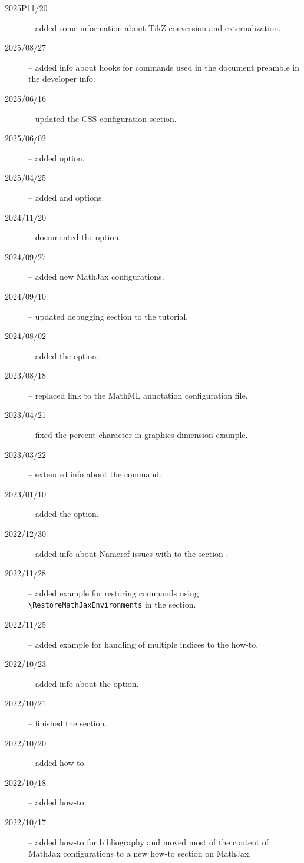 
\begin{description}
  \item[2025P11/20] -- added some information about TikZ conversion and externalization.
  \item[2025/08/27] -- added info about hooks for commands used in the document preamble in the developer info.
  \item[2025/06/16] -- updated the CSS configuration section.
  \item[2025/06/02] -- added  option.
  \item[2025/04/25] -- added  and  options.
  \item[2024/11/20] -- documented the  option.
  \item[2024/09/27] -- added new MathJax configurations. 
  \item[2024/09/10] -- updated debugging section to the tutorial.
  \item[2024/08/02] -- added the  option.
  \item[2023/08/18] -- replaced link to the MathML annotation configuration file.
  \item[2023/04/21] -- fixed the percent character in graphics dimension example.
  \item[2023/03/22] -- extended info about the  command.
  \item[2023/01/10] -- added the  option.
  \item[2022/12/30] -- added info about Nameref issues with  to the section .
  \item[2022/11/28] -- added example for restoring commands using \verb|\RestoreMathJaxEnvironments| in the  section.
  \item[2022/11/25] -- added example for handling of multiple indices to the  how-to.
  \item[2022/10/23] -- added info about the  option.
  \item[2022/10/21] -- finished the  section.
  \item[2022/10/20] -- added  how-to.
  \item[2022/10/18] -- added  how-to.
  \item[2022/10/17] -- added how-to for bibliography and moved most of the content of MathJax configurations to a new how-to section on MathJax. 

\end{description}

